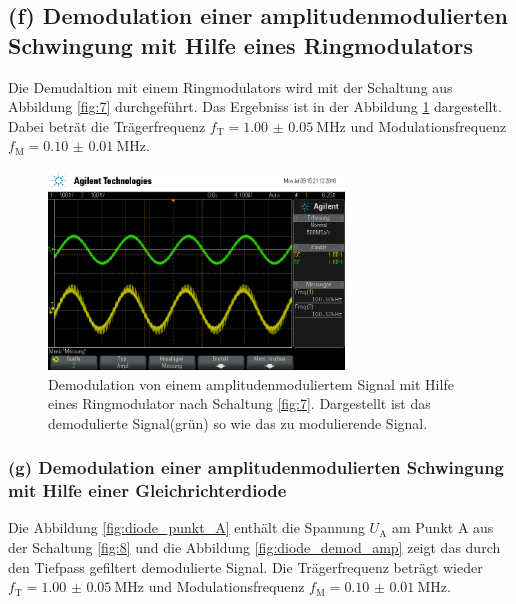 \FloatBarrier
\subsection{(f) Demodulation einer amplitudenmodulierten Schwingung
mit Hilfe eines Ringmodulators}
\label{subsubsec:auswertung_f}
Die Demudaltion mit einem Ringmodulators wird mit der Schaltung
aus Abbildung \ref{fig:7} durchgeführt. Das Ergebniss ist
in der Abbildung \ref{fig:amp_demod_ring} dargestellt.
Dabei beträt die Trägerfrequenz $f_{\text{T}}=\SI{1.00(5)}{\mega\hertz}$
und Modulationsfrequenz $f_{\text{M}}=\SI{0.10(1)}{\mega\hertz}$.


\begin{figure}
  \centering
  \includegraphics[width=0.7\textwidth]{osci/amp_demod.png}
  \caption{Demodulation von einem amplitudenmoduliertem Signal mit Hilfe eines
  Ringmodulator nach Schaltung \ref{fig:7}. Dargestellt ist das demodulierte Signal(grün) so wie das zu modulierende Signal.}
  \label{fig:amp_demod_ring}
\end{figure}




\FloatBarrier
\subsubsection{(g) Demodulation einer amplitudenmodulierten Schwingung
mit Hilfe einer Gleichrichterdiode}
\label{subsubsec:auswertung_g}
Die Abbildung \ref{fig:diode_punkt_A} enthält
die Spannung $U_{\text{A}}$ am Punkt A aus der
Schaltung \ref{fig:8} und die Abbildung \ref{fig:diode_demod_amp}
zeigt das durch den Tiefpass gefiltert demodulierte Signal.
Die Trägerfrequenz beträgt wieder $f_{\text{T}}=\SI{1.00(5)}{\mega\hertz}$
und Modulationsfrequenz $f_{\text{M}}=\SI{0.10(1)}{\mega\hertz}$.


